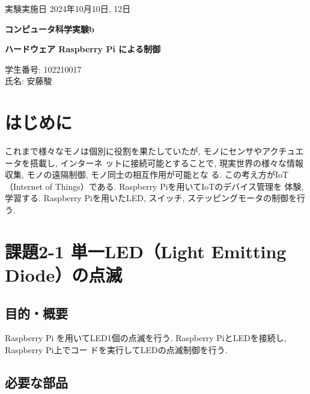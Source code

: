 \documentclass{ltjsarticle} %
\begin{document}
\thispagestyle{empty}
\begin{flushright}
{\large 実験実施日 2024年10月10日, 12日{\hspace{5cm}}} 
\end{flushright}

\vspace*{\fill}
\centering
{\Huge\bf コンピュータ科学実験b}
\vspace*{1cm}

{\huge\bf ハードウェア Raspberry Pi による制御}
\vspace*{\fill}

\vspace*{\fill}

\vspace*{\fill}

\begin{flushright}
{\large 学生番号: 102210017} \\ %
{\large 氏名: 安藤駿} \\
\end{flushright}

\clearpage

\addtocounter{page}{-1}
\raggedright
\setlength{\parindent}{1em}

\section{はじめに}
これまで様々なモノは個別に役割を果たしていたが, モノにセンサやアクチュエータを搭載し, インターネ
ットに接続可能とすることで, 現実世界の様々な情報収集, モノの遠隔制御, モノ同⼠の相互作⽤が可能とな
る. この考え⽅がIoT（Internet of Things）である. Raspberry Piを⽤いてIoTのデバイス管理を
体験, 学習する. Raspberry Piを⽤いたLED, スイッチ, ステッピングモータの制御を⾏う.


\section{課題2-1 単⼀LED（Light Emitting Diode）の点滅}

\subsection{目的・概要}
Raspberry Pi を⽤いてLED1個の点滅を⾏う. Raspberry PiとLEDを接続し, Raspberry Pi上でコー
ドを実⾏してLEDの点滅制御を⾏う. 

\subsection{必要な部品}
\end{document}
